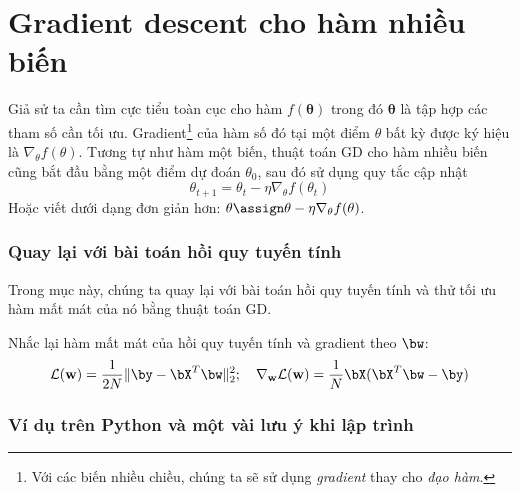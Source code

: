  
\section{Gradient descent cho hàm nhiều biến}
Giả sử ta cần tìm cực tiểu toàn cục cho hàm $f(\mathbf{\theta})$ trong đó
$\mathbf{\theta}$ là tập hợp các tham số cần tối ưu. Gradient\footnote{Với các
biến nhiều chiều, chúng ta sẽ sử dụng \textit{gradient} thay cho \textit{đạo
hàm}.} của hàm số đó tại một điểm $\theta$ bất kỳ được ký hiệu là
$\nabla_{\theta}f(\theta)$. Tương tự như hàm một biến, thuật toán GD cho hàm
nhiều biến cũng bắt đầu bằng một điểm dự đoán $\theta_{0}$, sau đó sử dụng quy
tắc cập nhật
\begin{equation} 
\boxed{
\theta_{t+1} = \theta_{t} - \eta \nabla_{\theta} f(\theta_{t}) 
}
\end{equation} 
Hoặc viết dưới dạng đơn giản hơn: $\theta \assign \theta - \eta \nabla_{\theta}
f(\theta)$.
 
 
 
\subsubsection{Quay lại với bài toán hồi quy tuyến tính}

Trong mục này, chúng ta quay lại với bài toán hồi quy tuyến tính và thử tối ưu
hàm mất mát của nó bằng thuật toán GD.
 
Nhắc lại hàm mất mát của hồi quy tuyến tính và gradient theo $\bw$:
\begin{equation} 
\mathcal{L}(\mathbf{w}) = \frac{1}{2N}\|\by - \bX^T\bw\|_2^2; \quad \nabla_{\mathbf{w}}\mathcal{L}(\mathbf{w}) =  
\frac{1}{N}\bX(\bX^T\bw - \by) 
\end{equation} 

  
\subsubsection{Ví dụ trên Python và một vài lưu ý khi lập trình}
 
 
 
 
